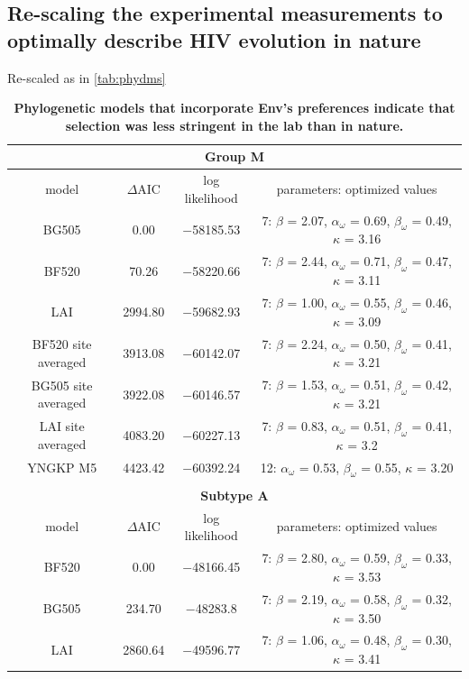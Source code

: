 \documentclass[9pt,lineno]{elife}
\begin{document}
\subsection*{Re-scaling the experimental measurements to optimally describe HIV evolution in nature}

Re-scaled as in \ref{tab:phydms}

\begin{table}
\centering
\caption{
{\bf Phylogenetic models that incorporate Env's preferences indicate that selection was less stringent in the lab than in nature.}}
{\footnotesize
\begin{tabular}{cccc}
\multicolumn{4}{c}{\bf{Group M}}\\
\hline
model & $\Delta$AIC & log likelihood & parameters: optimized values \\ 
\hline
BG505 & 0.00 & $-$58185.53 & 7: $\beta$ = 2.07, $\alpha_\omega$ = 0.69, $\beta_\omega$ = 0.49, $\kappa$ = 3.16\\
BF520 & 70.26 & $-$58220.66 & 7: $\beta$ = 2.44, $\alpha_\omega$ = 0.71, $\beta_\omega$ = 0.47, $\kappa$ = 3.11\\
LAI & 2994.80 & $-$59682.93 & 7: $\beta$ = 1.00, $\alpha_\omega$ = 0.55, $\beta_\omega$ = 0.46, $\kappa$ = 3.09\\
BF520 site averaged & 3913.08 & $-$60142.07 & 7: $\beta$ = 2.24, $\alpha_\omega$ = 0.50, $\beta_\omega$ = 0.41, $\kappa$ = 3.21\\
BG505 site averaged & 3922.08 & $-$60146.57 & 7: $\beta$ = 1.53, $\alpha_\omega$ = 0.51, $\beta_\omega$ = 0.42, $\kappa$ = 3.21\\
LAI site averaged & 4083.20 & $-$60227.13 & 7: $\beta$ = 0.83, $\alpha_\omega$ = 0.51, $\beta_\omega$ = 0.41, $\kappa$ = 3.2\\
YNGKP M5 & 4423.42 & $-$60392.24 & 12: $\alpha_\omega$ = 0.53, $\beta_\omega$ = 0.55, $\kappa$ = 3.20\\
\\
\multicolumn{4}{c}{\bf{Subtype A}}\\
\hline
model & $\Delta$AIC & log likelihood & parameters: optimized values \\ 
\hline
BF520 & 0.00 & $-$48166.45 & 7: $\beta$ = 2.80, $\alpha_\omega$ = 0.59, $\beta_\omega$ = 0.33, $\kappa$ = 3.53\\
BG505 & 234.70 & $-$48283.8 & 7: $\beta$ = 2.19, $\alpha_\omega$ = 0.58, $\beta_\omega$ = 0.32, $\kappa$ = 3.50\\
LAI & 2860.64 & $-$49596.77 & 7: $\beta$ = 1.06, $\alpha_\omega$ = 0.48, $\beta_\omega$ = 0.30, $\kappa$ = 3.41\\

\end{tabular}}
\end{table}
\end{document}

